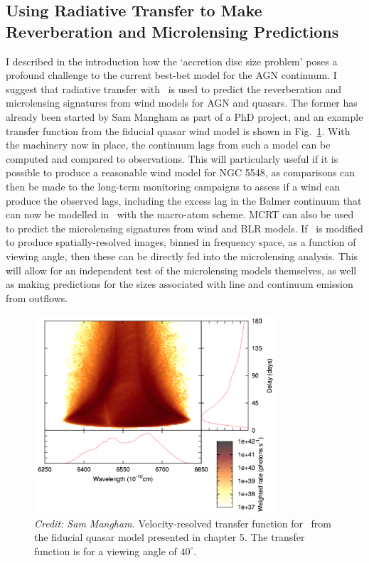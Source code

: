 \subsection{Using Radiative Transfer to Make Reverberation and Microlensing Predictions}

I described in the introduction how the `accretion disc size problem' poses
a profound challenge to the current best-bet model for the AGN continuum.
I suggest that radiative transfer with \py\ is used to predict the 
reverberation and microlensing signatures from wind models for AGN and quasars. 
The former has already been started by Sam Mangham as part of a PhD
project, and an example transfer function from the fiducial quasar wind model
is shown in Fig.~\ref{fig:halpha_transfer}. With the machinery now in place,
the continuum lags from such a model can be computed and compared to observations.
This will particularly useful if it is possible to produce a reasonable wind
model for NGC 5548, as comparisons can then be made to the long-term monitoring
campaigns \citep[e.g.][]{edelson2015} to assess if a wind can produce the observed 
lags, including the excess lag in the Balmer continuum that can now be modelled 
in \py\ with the macro-atom scheme. MCRT can also be used to predict 
the microlensing signatures from wind and BLR models. If \py\ is modified to produce
spatially-resolved images, binned in frequency space, as a function of viewing 
angle, then these can be directly fed into the microlensing analysis. This will
allow for an independent test of the microlensing models themselves, as well as
making predictions for the sizes associated with line and continuum emission from
outflows. 

\begin{figure} 
\centering
\includegraphics[width=0.8\textwidth]{figures/ewpaper/halpha_transfer.png}
\caption
{
{\sl Credit: Sam Mangham.}
Velocity-resolved transfer function for \ha\ 
from the fiducial quasar model presented in
chapter 5. The transfer function is for a viewing angle of 
$40^\circ$. 
}
\label{fig:halpha_transfer}
\end{figure} 

